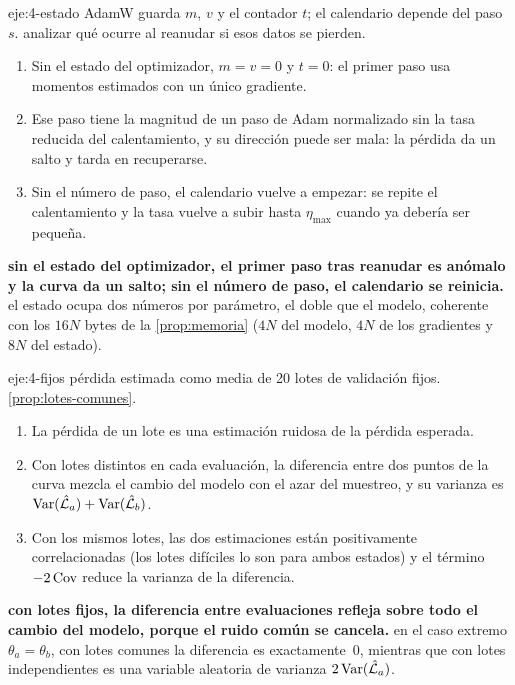 \begin{solucion}{eje:4-estado}
\datos AdamW guarda $m$, $v$ y el contador $t$; el calendario depende del paso $s$.
\planteamiento analizar qué ocurre al reanudar si esos datos se pierden.
\pasos
\begin{enumerate}[label=\arabic*.]
  \item Sin el estado del optimizador, $m=v=0$ y $t=0$: el primer paso usa momentos estimados con un único gradiente.
  \item Ese paso tiene la magnitud de un paso de Adam normalizado sin la tasa reducida del calentamiento, y su dirección puede ser mala: la pérdida da un salto y tarda en recuperarse.
  \item Sin el número de paso, el calendario vuelve a empezar: se repite el calentamiento y la tasa vuelve a subir hasta $\eta_{\max}$ cuando ya debería ser pequeña.
\end{enumerate}
\resultado \textbf{sin el estado del optimizador, el primer paso tras reanudar es anómalo y la curva da un salto; sin el número de paso, el calendario se reinicia.}
\comprobacion el estado ocupa dos números por parámetro, el doble que el modelo, coherente con los $16N$ bytes de la \cref{prop:memoria} ($4N$ del modelo, $4N$ de los gradientes y $8N$ del estado).
\end{solucion}

\begin{solucion}{eje:4-fijos}
\datos pérdida estimada como media de 20 lotes de validación fijos.
\planteamiento \cref{prop:lotes-comunes}.
\pasos
\begin{enumerate}[label=\arabic*.]
  \item La pérdida de un lote es una estimación ruidosa de la pérdida esperada.
  \item Con lotes distintos en cada evaluación, la diferencia entre dos puntos de la curva mezcla el cambio del modelo con el azar del muestreo, y su varianza es $\operatorname{Var}(\hat{\mathcal{L}}_a)+\operatorname{Var}(\hat{\mathcal{L}}_b)$.
  \item Con los mismos lotes, las dos estimaciones están positivamente correlacionadas (los lotes difíciles lo son para ambos estados) y el término $-2\operatorname{Cov}$ reduce la varianza de la diferencia.
\end{enumerate}
\resultado \textbf{con lotes fijos, la diferencia entre evaluaciones refleja sobre todo el cambio del modelo, porque el ruido común se cancela.}
\comprobacion en el caso extremo $\theta_a=\theta_b$, con lotes comunes la diferencia es exactamente~0, mientras que con lotes independientes es una variable aleatoria de varianza $2\operatorname{Var}(\hat{\mathcal{L}}_a)$.
\end{solucion}


